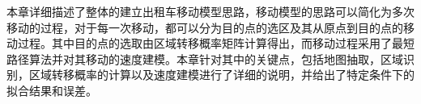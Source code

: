 本章详细描述了整体的建立出租车移动模型思路，移动模型的思路可以简化为多次移动的过程，对于每一次移动，都可以分为目的点的选区及其从原点到目的点的移动过程。其中目的点的选取由区域转移概率矩阵计算得出，而移动过程采用了最短路径算法并对其移动的速度建模。本章针对其中的关键点，包括地图抽取，区域识别，区域转移概率的计算以及速度建模进行了详细的说明，并给出了特定条件下的拟合结果和误差。